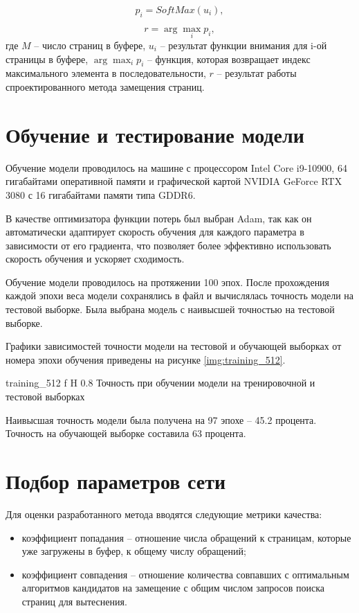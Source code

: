 \begin{equation}\label{formula:evict_2}
	p_i = SoftMax(u_i),
\end{equation}

\begin{equation}\label{formula:evict_3}
	r = \arg\max_{i} p_i,
\end{equation}
где $M$ -- число страниц в буфере, $u_i$ -- результат функции внимания для i-ой страницы в буфере, $\arg\max_{i} p_i$ -- функция, которая возвращает индекс максимального элемента в последовательности, $r$ -- результат работы спроектированного метода замещения страниц.

\section{Обучение и тестирование модели}

Обучение модели проводилось на машине с процессором Intel Core i9-10900, 64 гигабайтами оперативной памяти и графической картой NVIDIA GeForce RTX 3080 с 16 гигабайтами памяти типа GDDR6.

В качестве оптимизатора функции потерь был выбран Adam, так как он автоматически адаптирует скорость обучения для каждого параметра в зависимости от его градиента, что позволяет более эффективно использовать скорость обучения и ускоряет сходимость.

Обучение модели проводилось на протяжении 100 эпох.
После прохождения каждой эпохи веса модели сохранялись в файл и вычислялась точность модели на тестовой выборке.
Была выбрана модель с наивысшей точностью на тестовой выборке.

Графики зависимостей точности модели на тестовой и обучающей выборках от номера эпохи обучения приведены на рисунке \ref{img:training_512}.

{training_512} %
{f} %
{H} %
{0.8\textwidth} %
{Точность при обучении модели на тренировочной и тестовой выборках} %

Наивысшая точность модели была получена на 97 эпохе -- 45.2 процента.
Точность на обучающей выборке составила 63 процента.

\section{Подбор параметров сети}
Для оценки разработанного метода вводятся следующие метрики качества:
\begin{itemize}
	\item коэффициент попадания -- отношение числа обращений к страницам, которые уже загружены в буфер, к общему числу обращений;
	\item коэффициент совпадения -- отношение количества совпавших с оптимальным алгоритмов кандидатов на замещение с общим числом запросов поиска страниц для вытеснения.
\end{itemize}

